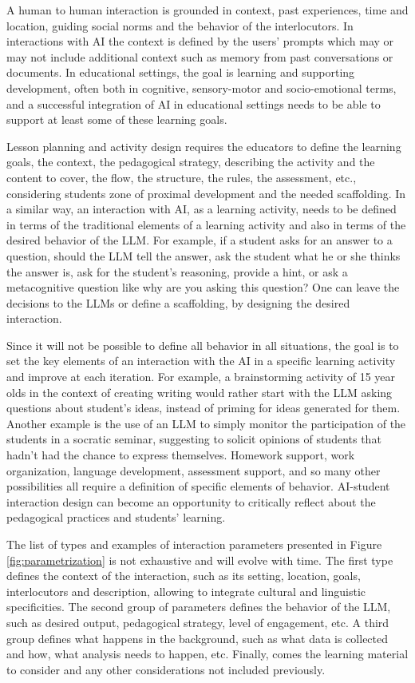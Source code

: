 \documentclass[fleqn,10pt]{wlscirep}
\begin{document}
A human to human interaction is grounded in context, past experiences, time and location, guiding social norms and the behavior of the interlocutors. In interactions with AI the context is defined by the users' prompts which may or may not include additional context such as memory from past conversations or documents. In educational settings, the goal is learning and supporting development, often both in cognitive, sensory-motor and socio-emotional terms, and a successful integration of AI in educational settings needs to be able to support at least some of these learning goals.

Lesson planning and activity design requires the educators to define the learning goals, the context, the pedagogical strategy, describing the activity and the content to cover, the flow, the structure, the rules, the assessment, etc., considering students zone of proximal development and the needed scaffolding. In a similar way, an interaction with AI, as a learning activity, needs to be defined in terms of the traditional elements of a learning activity and also in terms of the desired behavior of the LLM. For example, if a student asks for an answer to a question, should the LLM tell the answer, ask the student what he or she thinks the answer is, ask for the student's reasoning, provide a hint, or ask a metacognitive question like why are you asking this question? One can leave the decisions to the LLMs or define a scaffolding, by designing the desired interaction.

Since it will not be possible to define all behavior in all situations, the goal is to set the key elements of an interaction with the AI in a specific learning activity and improve at each iteration. For example, a brainstorming activity of 15 year olds in the context of creating writing would rather start with the LLM asking questions about student's ideas, instead of priming for ideas generated for them. Another example is the use of an LLM to simply monitor the participation of the students in a socratic seminar, suggesting to solicit opinions of students that hadn't had the chance to express themselves. Homework support, work organization, language development, assessment support, and so many other possibilities all require a definition of specific elements of behavior. AI-student interaction design can become an opportunity to critically reflect about the pedagogical practices and students' learning.

The list of types and examples of interaction parameters presented in Figure \ref{fig:parametrization} is not exhaustive and will evolve with time. The first type defines the context of the interaction, such as its setting, location, goals, interlocutors and description, allowing to integrate cultural and linguistic specificities. The second group of parameters defines the behavior of the LLM, such as desired output, pedagogical strategy, level of engagement, etc. A third group defines what happens in the background, such as what data is collected and how, what analysis needs to happen, etc. Finally, comes the learning material to consider and any other considerations not included previously.
\end{document}
